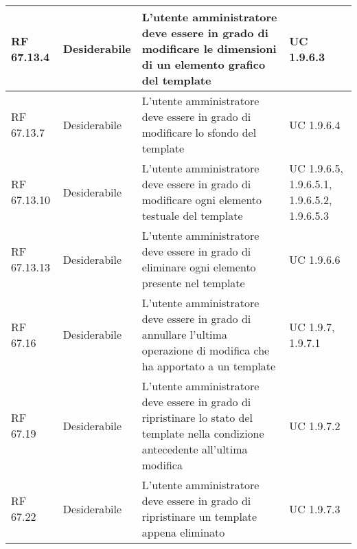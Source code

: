 {\begin{longtable} [c]{| p{2.5cm} | p{2.5cm} | p{6cm} |p{2.5cm}|}
			\hline
			RF 67.13.4 & Desiderabile & L'utente amministratore deve essere in grado di modificare le dimensioni di un elemento grafico del template & UC 1.9.6.3\\
			\hline
			RF 67.13.7 & Desiderabile & L'utente amministratore deve essere in grado di modificare lo sfondo del template & UC 1.9.6.4\\
			\hline
			RF 67.13.10 & Desiderabile & L'utente amministratore deve essere in grado di modificare ogni elemento testuale del template & UC 1.9.6.5, 1.9.6.5.1, 1.9.6.5.2, 1.9.6.5.3\\
			\hline
			RF 67.13.13 & Desiderabile & L'utente amministratore deve essere in grado di eliminare ogni elemento presente nel template & UC 1.9.6.6\\
			\hline
			RF 67.16 & Desiderabile & L'utente amministratore deve essere in grado di annullare l'ultima operazione di modifica che ha apportato a un template & UC 1.9.7, 1.9.7.1\\
			\hline
			RF 67.19 & Desiderabile & L'utente amministratore deve essere in grado di ripristinare lo stato del template nella condizione antecedente all'ultima modifica & UC 1.9.7.2\\
			\hline
			RF 67.22 & Desiderabile & L'utente amministratore deve essere in grado di ripristinare un template appena eliminato & UC 1.9.7.3\\
		\end{longtable}
	}